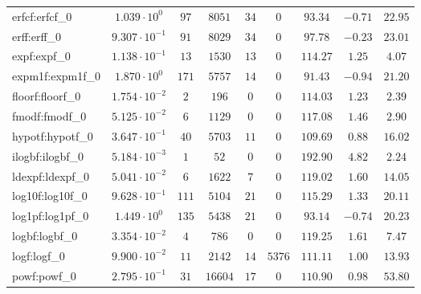 \begin{tabular}{|l|c|c|c|c|c|c|c|c|}
erfcf:erfcf\_0               & $ 1.039 \cdot 10^{0}  $ & $ 97     $ & $ 8051   $ & $ 34  $ & $ 0    $ & $ 93.34       $ & $ -0.71   $ & $ 22.95   $ \\
erff:erff\_0                 & $ 9.307 \cdot 10^{-1} $ & $ 91     $ & $ 8029   $ & $ 34  $ & $ 0    $ & $ 97.78       $ & $ -0.23   $ & $ 23.01   $ \\
expf:expf\_0                 & $ 1.138 \cdot 10^{-1} $ & $ 13     $ & $ 1530   $ & $ 13  $ & $ 0    $ & $ 114.27      $ & $ 1.25    $ & $ 4.07    $ \\
expm1f:expm1f\_0             & $ 1.870 \cdot 10^{0}  $ & $ 171    $ & $ 5757   $ & $ 14  $ & $ 0    $ & $ 91.43       $ & $ -0.94   $ & $ 21.20   $ \\
floorf:floorf\_0             & $ 1.754 \cdot 10^{-2} $ & $ 2      $ & $ 196    $ & $ 0   $ & $ 0    $ & $ 114.03      $ & $ 1.23    $ & $ 2.39    $ \\
fmodf:fmodf\_0               & $ 5.125 \cdot 10^{-2} $ & $ 6      $ & $ 1129   $ & $ 0   $ & $ 0    $ & $ 117.08      $ & $ 1.46    $ & $ 2.90    $ \\
hypotf:hypotf\_0             & $ 3.647 \cdot 10^{-1} $ & $ 40     $ & $ 5703   $ & $ 11  $ & $ 0    $ & $ 109.69      $ & $ 0.88    $ & $ 16.02   $ \\
ilogbf:ilogbf\_0             & $ 5.184 \cdot 10^{-3} $ & $ 1      $ & $ 52     $ & $ 0   $ & $ 0    $ & $ 192.90      $ & $ 4.82    $ & $ 2.24    $ \\
ldexpf:ldexpf\_0             & $ 5.041 \cdot 10^{-2} $ & $ 6      $ & $ 1622   $ & $ 7   $ & $ 0    $ & $ 119.02      $ & $ 1.60    $ & $ 14.05   $ \\
log10f:log10f\_0             & $ 9.628 \cdot 10^{-1} $ & $ 111    $ & $ 5104   $ & $ 21  $ & $ 0    $ & $ 115.29      $ & $ 1.33    $ & $ 20.11   $ \\
log1pf:log1pf\_0             & $ 1.449 \cdot 10^{0}  $ & $ 135    $ & $ 5438   $ & $ 21  $ & $ 0    $ & $ 93.14       $ & $ -0.74   $ & $ 20.23   $ \\
logbf:logbf\_0               & $ 3.354 \cdot 10^{-2} $ & $ 4      $ & $ 786    $ & $ 0   $ & $ 0    $ & $ 119.25      $ & $ 1.61    $ & $ 7.47    $ \\
logf:logf\_0                 & $ 9.900 \cdot 10^{-2} $ & $ 11     $ & $ 2142   $ & $ 14  $ & $ 5376 $ & $ 111.11      $ & $ 1.00    $ & $ 13.93   $ \\
powf:powf\_0                 & $ 2.795 \cdot 10^{-1} $ & $ 31     $ & $ 16604  $ & $ 17  $ & $ 0    $ & $ 110.90      $ & $ 0.98    $ & $ 53.80   $ \\

\end{tabular}
